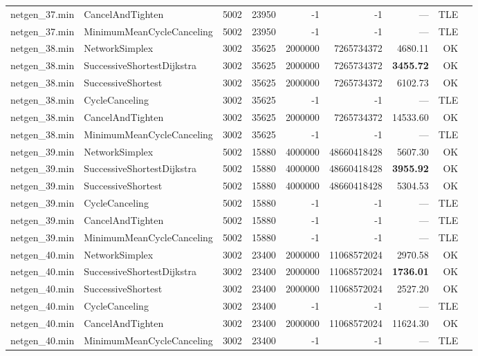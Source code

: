 \begin{longtable}{llrrrrrrl}
netgen\_37.min & CancelAndTighten & 5002 & 23950 & -1 & -1 & --- & TLE \\
netgen\_37.min & MinimumMeanCycleCanceling & 5002 & 23950 & -1 & -1 & --- & TLE \\
\midrule
netgen\_38.min & NetworkSimplex & 3002 & 35625 & 2000000 & 7265734372 & 4680.11 & OK \\
netgen\_38.min & SuccessiveShortestDijkstra & 3002 & 35625 & 2000000 & 7265734372 & \textbf{3455.72} & OK \\
netgen\_38.min & SuccessiveShortest & 3002 & 35625 & 2000000 & 7265734372 & 6102.73 & OK \\
netgen\_38.min & CycleCanceling & 3002 & 35625 & -1 & -1 & --- & TLE \\
netgen\_38.min & CancelAndTighten & 3002 & 35625 & 2000000 & 7265734372 & 14533.60 & OK \\
netgen\_38.min & MinimumMeanCycleCanceling & 3002 & 35625 & -1 & -1 & --- & TLE \\
\midrule
netgen\_39.min & NetworkSimplex & 5002 & 15880 & 4000000 & 48660418428 & 5607.30 & OK \\
netgen\_39.min & SuccessiveShortestDijkstra & 5002 & 15880 & 4000000 & 48660418428 & \textbf{3955.92} & OK \\
netgen\_39.min & SuccessiveShortest & 5002 & 15880 & 4000000 & 48660418428 & 5304.53 & OK \\
netgen\_39.min & CycleCanceling & 5002 & 15880 & -1 & -1 & --- & TLE \\
netgen\_39.min & CancelAndTighten & 5002 & 15880 & -1 & -1 & --- & TLE \\
netgen\_39.min & MinimumMeanCycleCanceling & 5002 & 15880 & -1 & -1 & --- & TLE \\
\midrule
netgen\_40.min & NetworkSimplex & 3002 & 23400 & 2000000 & 11068572024 & 2970.58 & OK \\
netgen\_40.min & SuccessiveShortestDijkstra & 3002 & 23400 & 2000000 & 11068572024 & \textbf{1736.01} & OK \\
netgen\_40.min & SuccessiveShortest & 3002 & 23400 & 2000000 & 11068572024 & 2527.20 & OK \\
netgen\_40.min & CycleCanceling & 3002 & 23400 & -1 & -1 & --- & TLE \\
netgen\_40.min & CancelAndTighten & 3002 & 23400 & 2000000 & 11068572024 & 11624.30 & OK \\
netgen\_40.min & MinimumMeanCycleCanceling & 3002 & 23400 & -1 & -1 & --- & TLE \\
\end{longtable}
\endgroup
